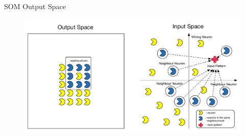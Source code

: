 \begin{frame}{SOM Output Space}
  \begin{figure}
    \centering
    \includegraphics[width=1\textwidth]{images/5_neighbours_converge-eps-converted-to.pdf}
    \label{fig:MeasurementCatPriority}
  \end{figure}
\end{frame}
